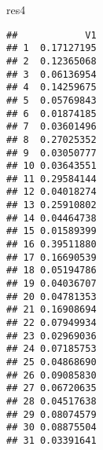 \documentclass[
]{article}
\newenvironment{Shaded}{\begin{snugshade}}{\end{snugshade}}
\newcommand{\NormalTok}[1]{#1}
\begin{document}
\begin{Shaded}
\begin{Highlighting}[]
\NormalTok{res4}
\end{Highlighting}
\end{Shaded}

\begin{verbatim}
##            V1
## 1  0.17127195
## 2  0.12365068
## 3  0.06136954
## 4  0.14259675
## 5  0.05769843
## 6  0.01874185
## 7  0.03601496
## 8  0.27025352
## 9  0.03050777
## 10 0.03643551
## 11 0.29584144
## 12 0.04018274
## 13 0.25910802
## 14 0.04464738
## 15 0.01589399
## 16 0.39511880
## 17 0.16690539
## 18 0.05194786
## 19 0.04036707
## 20 0.04781353
## 21 0.16908694
## 22 0.07949934
## 23 0.02969036
## 24 0.07185753
## 25 0.04868690
## 26 0.09085830
## 27 0.06720635
## 28 0.04517638
## 29 0.08074579
## 30 0.08875504
## 31 0.03391641
\end{verbatim}
\end{document}
